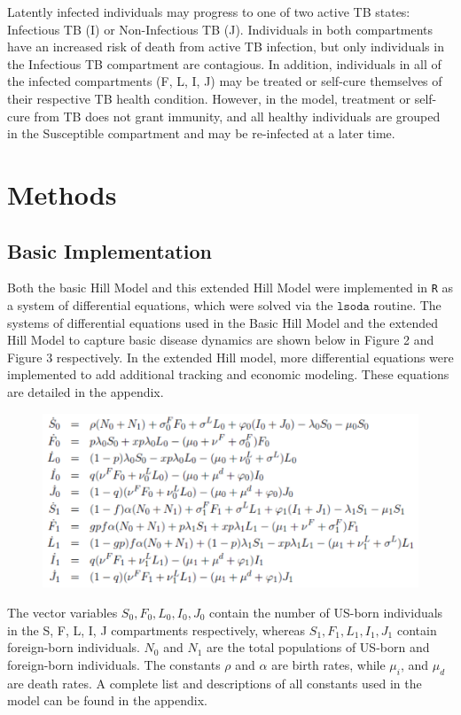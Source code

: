 \documentclass{amsart}
\begin{document}
Latently infected individuals may progress to one of two active TB states: Infectious TB (I) or 
Non-Infectious TB (J).  Individuals in both compartments have an increased risk of death from
active TB infection, but only individuals in the Infectious TB compartment are contagious.  
In addition, individuals in all of the infected compartments (F, L, I, J) may be treated or self-cure
themselves of their respective TB health condition.  However, in the model, treatment or self-cure from TB
does not grant immunity, and all healthy individuals are grouped in the Susceptible compartment
and may be re-infected at a later time.  \\

\section{Methods}
\subsection{Basic Implementation}
Both the basic Hill Model and this extended Hill Model were implemented in
\texttt{R} as a system of differential equations, which were solved via the
$\texttt{lsoda}$ routine. The systems of differential equations used in the Basic
Hill Model and the extended Hill Model to capture basic disease dynamics are
shown below in Figure 2 and Figure 3 respectively. In the extended Hill model,
more differential equations were implemented to add additional tracking and
economic modeling. These equations are detailed in the appendix. 

\begin{figure}
\includegraphics[scale=0.75]{figures/BasicHillEquations.pdf}
\end{figure}

The vector variables $S_{0}, F_{0}, L_{0}, I_{0}, J_{0}$ contain the number of
US-born individuals in the S, F, L, I, J compartments respectively, whereas $S_{1},
F_{1}, L_{1}, I_{1}, J_{1}$ contain foreign-born individuals.  $N_{0}$ and
$N_{1}$ are the total populations of US-born and foreign-born individuals.
The constants $\rho$ and $\alpha$ are birth rates, while $\mu_{i}$, and $\mu_{d}$ are death rates.  
A complete list and descriptions of all constants used in the model can be found in the appendix.
\end{document}
